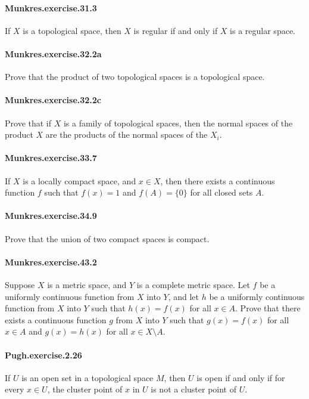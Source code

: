 \documentclass{article}
\begin{document}
\paragraph{Munkres.exercise.31.3} If $X$ is a topological space, then $X$ is regular if and only if $X$ is a regular space.

\paragraph{Munkres.exercise.32.2a} Prove that the product of two topological spaces is a topological space.

\paragraph{Munkres.exercise.32.2c} Prove that if $X$ is a family of topological spaces, then the normal spaces of the product $X$ are the products of the normal spaces of the $X_i$.

\paragraph{Munkres.exercise.33.7} If $X$ is a locally compact space, and $x \in X$, then there exists a continuous function $f$ such that $f(x) = 1$ and $f(A) = \{0\}$ for all closed sets $A$.

\paragraph{Munkres.exercise.34.9} Prove that the union of two compact spaces is compact.

\paragraph{Munkres.exercise.43.2} Suppose $X$ is a metric space, and $Y$ is a complete metric space. Let $f$ be a uniformly continuous function from $X$ into $Y$, and let $h$ be a uniformly continuous function from $X$ into $Y$ such that $h(x)=f(x)$ for all $x \in A$. Prove that there exists a continuous function $g$ from $X$ into $Y$ such that $g(x)=f(x)$ for all $x \in A$ and $g(x)=h(x)$ for all $x \in X \setminus A$.

\paragraph{Pugh.exercise.2.26} If $U$ is an open set in a topological space $M$, then $U$ is open if and only if for every $x \in U$, the cluster point of $x$ in $U$ is not a cluster point of $U$.
\end{document}
